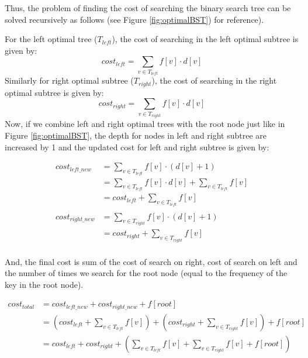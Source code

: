\documentclass[11pt]{article}
\theoremstyle{definition}
\begin{document}
    Thus, the problem of finding the cost of searching the binary search tree can be solved recursively as follows (see Figure \ref{fig:optimalBST}) for reference).

For the left optimal tree ($T_{left}$), the cost of searching in the left optimal subtree is given by: 
    \begin{equation}
        cost_{left} = \sum_{v \in T_{left}} f[v]\cdot d[v]
    \end{equation}
    Similarly for right optimal subtree ($T_{right}$), the cost of searching in the right optimal subtree is given by:
    \begin{equation}
        cost_{right} = \sum_{v \in T_{right}} f[v]\cdot d[v]
    \end{equation}
    Now, if we combine left and right optimal trees with the root node just like in Figure \ref{fig:optimalBST}, the depth for nodes in left and right subtree are increased by 1 and the updated cost for left and right subtree is given by: 
    \begin{center}
        \begin{align*}
            cost_{left\_new} &= \sum_{v \in  T_{left}} f[v]\cdot (d[v] +1)\\
            &= \sum_{v \in  T_{left}} f[v]\cdot d[v] + \sum_{v \in  T_{left}} f[v]\\
            &= cost_{left} + \sum_{v \in  T_{left}} f[v]\\
            \\
            cost_{right\_new} &= \sum_{v \in  T_{right}} f[v]\cdot  (d[v] +1)\\
            &= cost_{right} + \sum_{v \in  T_{right}} f[v]\\
        \end{align*}
    \end{center}
    And, the final cost is sum of the cost of search on right, cost of search on left and the number of times we search for the root node (equal to the frequency of the key in the root node).
    \begin{center}
        \begin{align*}
            cost_{total} &= cost_{left\_new} + cost_{right\_new} + f[root]\\
            &= \left(cost_{left} + \sum_{v \in  T_{left}} f[v] \right)+ \left(cost_{right}   + \sum_{v \in  T_{right}} f[v]\right) + f[root] \\
            &= cost_{left} + cost_{right}   + \left(\sum_{v \in  T_{left}} f[v] + \sum_{v \in  T_{right}} f[v] + f[root]\right)
        \end{align*}
    \end{center}
    
\end{document}
